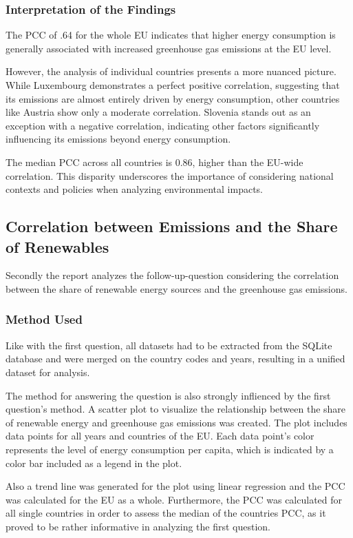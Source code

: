 \documentclass{article}
\begin{document}
\subsubsection*{Interpretation of the Findings}
The PCC of .64 for the whole EU indicates that higher energy consumption is generally associated with increased greenhouse gas emissions at the EU level.

However, the analysis of individual countries presents a more nuanced picture. While Luxembourg demonstrates a perfect positive correlation,
suggesting that its emissions are almost entirely driven by energy consumption, other countries like Austria show only a moderate correlation.
Slovenia stands out as an exception with a negative correlation, indicating other factors significantly influencing its emissions beyond energy consumption.

The median PCC across all countries is 0.86, higher than the EU-wide correlation. This disparity underscores the importance of considering national contexts
and policies when analyzing environmental impacts.

\subsection*{Correlation between Emissions and the Share of Renewables}
Secondly the report analyzes the follow-up-question considering the correlation between the share of renewable energy sources and the greenhouse
gas emissions.

\subsubsection*{Method Used}
Like with the first question, all datasets had to be extracted from the SQLite database and were merged on the country codes
and years, resulting in a unified dataset for analysis.

The method for answering the question is also strongly inflienced by the first question's method.
A scatter plot to visualize the relationship between the share of renewable energy and greenhouse gas emissions was created.
The plot includes data points for all years and countries of the EU. Each data point's color represents the level of energy consumption per capita,
which is indicated by a color bar included as a legend in the plot.

Also a trend line was generated for the plot using linear regression and the PCC was calculated for the EU as a whole.
Furthermore, the PCC was calculated for all single countries in order to assess the median of the countries PCC, as it proved to be
rather informative in analyzing the first question.
\end{document}
